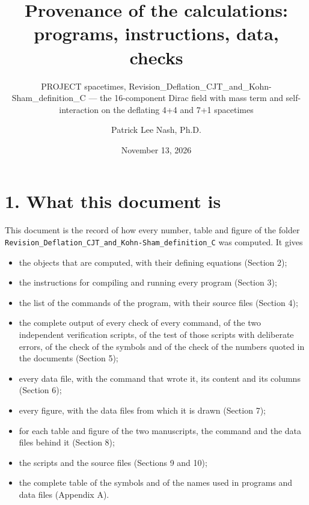 \documentclass[
  10pt,
]{article}
\title{Provenance of the calculations: programs, instructions, data,
checks}
\subtitle{PROJECT spacetimes,
Revision\_Deflation\_CJT\_and\_Kohn-Sham\_definition\_C --- the
16-component Dirac field with mass term and self-interaction on the
deflating 4+4 and 7+1 spacetimes}
\author{Patrick Lee Nash, Ph.D.}
\date{November 13, 2026}
\providecommand{\tightlist}{%
  \setlength{\itemsep}{0pt}\setlength{\parskip}{0pt}}
\begin{document}
\maketitle

\hypertarget{what-this-document-is}{%
\section{1. What this document is}\label{what-this-document-is}}

This document is the record of how every number, table and figure of the
folder \texttt{Revision\_Deflation\_CJT\_and\_Kohn-Sham\_definition\_C}
was computed. It gives

\begin{itemize}
\tightlist
\item
  the objects that are computed, with their defining equations (Section
  2);
\item
  the instructions for compiling and running every program (Section 3);
\item
  the list of the commands of the program, with their source files
  (Section 4);
\item
  the complete output of every check of every command, of the two
  independent verification scripts, of the test of those scripts with
  deliberate errors, of the check of the symbols and of the check of the
  numbers quoted in the documents (Section 5);
\item
  every data file, with the command that wrote it, its content and its
  columns (Section 6);
\item
  every figure, with the data files from which it is drawn (Section 7);
\item
  for each table and figure of the two manuscripts, the command and the
  data files behind it (Section 8);
\item
  the scripts and the source files (Sections 9 and 10);
\item
  the complete table of the symbols and of the names used in programs
  and data files (Appendix A).
\end{itemize}
\end{document}
